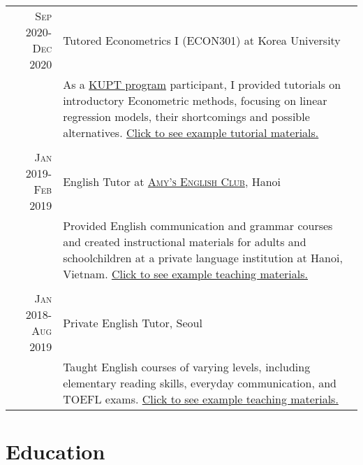 \documentclass[a4paper,10pt]{article} %
\begin{document}
\begin{tabular}{r|p{11cm}}
\textsc{Sep 2020-Dec 2020} & Tutored Econometrics I (ECON301) at Korea
University \\
& \footnotesize{As a
\href{https://ctl.korea.ac.kr/front/content/view.do?content_seq=14}{KUPT
program} participant,
I provided tutorials on introductory Econometric methods, focusing on linear
regression models, their shortcomings and possible alternatives.
\href{https://drive.google.com/file/d/1CJsRSpE2bg21PmoyaiDFtcpwFTPXwAAa/view?usp=sharing}{Click
to see example tutorial materials.}} \\
\multicolumn{2}{c}{} \\

\textsc{Jan 2019-Feb 2019} & English Tutor at
\href{https://www.facebook.com/amy.englishclub}{\textsc{Amy's English Club}}, Hanoi \emph{}\\
& \footnotesize{Provided English communication
and grammar courses and created instructional materials for adults and schoolchildren at a private language
institution at Hanoi, Vietnam.
\href{https://drive.google.com/file/d/1Wb8tWkcThmKiy-Rv2OMMWRkrg-6ddooL/view?usp=sharing}{Click
to see example teaching materials.}}\\
\multicolumn{2}{c}{} \\


\textsc{Jan 2018-Aug 2019} & Private English Tutor, Seoul \emph{}\\
& \footnotesize{Taught English courses of varying
levels, including elementary reading skills,
everyday communication, and TOEFL exams. \href{https://drive.google.com/file/d/1uuF_h_x29hSJ3l61F7Kzxi_kKohBBTpJ/view?usp=sharing}{Click
to see example teaching materials.}}\\

\end{tabular}


\section{Education}
\end{document}
